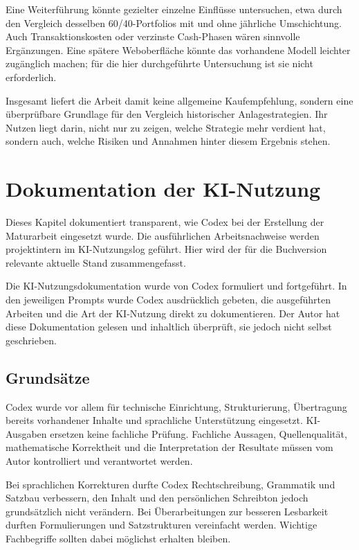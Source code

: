 \documentclass[
  ngerman,
  a4paper,
  DIV=11,
  oneside]{scrreprt}
\begin{document}
Eine Weiterführung könnte gezielter einzelne Einflüsse untersuchen, etwa
durch den Vergleich desselben 60/40-Portfolios mit und ohne jährliche
Umschichtung. Auch Transaktionskosten oder verzinste Cash-Phasen wären
sinnvolle Ergänzungen. Eine spätere Weboberfläche könnte das vorhandene
Modell leichter zugänglich machen; für die hier durchgeführte
Untersuchung ist sie nicht erforderlich.

Insgesamt liefert die Arbeit damit keine allgemeine Kaufempfehlung,
sondern eine überprüfbare Grundlage für den Vergleich historischer
Anlagestrategien. Ihr Nutzen liegt darin, nicht nur zu zeigen, welche
Strategie mehr verdient hat, sondern auch, welche Risiken und Annahmen
hinter diesem Ergebnis stehen.

\cleardoublepage
{}
{}
\appendix

\chapter{Dokumentation der
KI-Nutzung}\label{dokumentation-der-ki-nutzung}

Dieses Kapitel dokumentiert transparent, wie Codex bei der Erstellung
der Maturarbeit eingesetzt wurde. Die ausführlichen Arbeitsnachweise
werden projektintern im KI-Nutzungslog geführt. Hier wird der für die
Buchversion relevante aktuelle Stand zusammengefasst.

Die KI-Nutzungsdokumentation wurde von Codex formuliert und fortgeführt.
In den jeweiligen Prompts wurde Codex ausdrücklich gebeten, die
ausgeführten Arbeiten und die Art der KI-Nutzung direkt zu
dokumentieren. Der Autor hat diese Dokumentation gelesen und inhaltlich
überprüft, sie jedoch nicht selbst geschrieben.

\section{Grundsätze}\label{grundsuxe4tze}

Codex wurde vor allem für technische Einrichtung, Strukturierung,
Übertragung bereits vorhandener Inhalte und sprachliche Unterstützung
eingesetzt. KI-Ausgaben ersetzen keine fachliche Prüfung. Fachliche
Aussagen, Quellenqualität, mathematische Korrektheit und die
Interpretation der Resultate müssen vom Autor kontrolliert und
verantwortet werden.

Bei sprachlichen Korrekturen durfte Codex Rechtschreibung, Grammatik und
Satzbau verbessern, den Inhalt und den persönlichen Schreibton jedoch
grundsätzlich nicht verändern. Bei Überarbeitungen zur besseren
Lesbarkeit durften Formulierungen und Satzstrukturen vereinfacht werden.
Wichtige Fachbegriffe sollten dabei möglichst erhalten bleiben.
\end{document}
